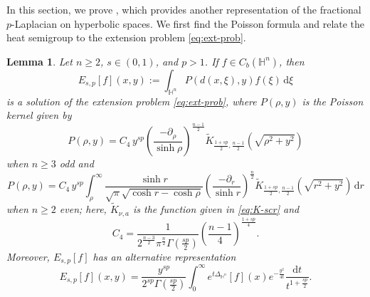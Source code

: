 \documentclass[11pt]{amsart}
\theoremstyle{plain}
\newtheorem{lemma}[theorem]{Lemma}
\theoremstyle{definition}
\numberwithin{equation}{section}
\begin{document}
In this section, we prove , which provides another representation of the fractional $p$-Laplacian on hyperbolic spaces. We first find the Poisson formula and relate the heat semigroup to the extension problem \eqref{eq:ext-prob}.

\begin{lemma} \label{lem:Poisson}
Let $n \geq 2$, $s \in (0,1)$, and $p > 1$. If $f \in C_{b}(\mathbb{H}^{n})$, then
\begin{equation*}
E_{s, p}[f](x, y) := \int_{\mathbb{H}^{n}} P(d(x,\xi), y) f(\xi) \,\mathrm{d}\xi
\end{equation*}
is a solution of the extension problem \eqref{eq:ext-prob}, where $P(\rho, y)$ is the Poisson kernel given by
\begin{equation*}
P(\rho, y) = C_{4} \, y^{sp} \left( \frac{-\partial_\rho}{\sinh \rho} \right)^{\frac{n-1}{2}} \widetilde{K}_{\frac{1+sp}{2},\frac{n-1}{2}} \left( \sqrt{\rho^{2}+y^{2}} \right)
\end{equation*}
when $n \geq 3$ odd and
\begin{equation*}
P(\rho, y) = C_{4} \, y^{sp} \int_{\rho}^{\infty} \frac{\sinh r}{\sqrt{\pi}\sqrt{\cosh r - \cosh \rho}} \left( \frac{-\partial_{r}}{\sinh r} \right)^{\frac{n}{2}} \widetilde{K}_{\frac{1+sp}{2},\frac{n-1}{2}}\left( \sqrt{r^{2}+y^{2}} \right)\, \mathrm{d}r
\end{equation*}
when $n \geq 2$ even; here, $\widetilde{K}_{\nu,a}$ is the function given in \eqref{eq:K-scr} and
\begin{equation*}
C_{4} = \frac{1}{2^{\frac{n-3}{2}}\pi^{\frac{n}{2}} \Gamma(\frac{sp}{2})} \left( \frac{n-1}{4} \right)^{\frac{1+sp}{4}}.
\end{equation*}
Moreover, $E_{s, p}[f]$ has an alternative representation
\begin{equation} \label{eq:U}
E_{s, p}[f](x, y) = \frac{y^{sp}}{2^{sp}\Gamma(\frac{sp}{2})} \int_{0}^{\infty} e^{t\Delta_{\mathbb{H}^{n}}}[f](x) e^{-\frac{y^2}{4t}} \frac{\mathrm{d}t}{t^{1+\frac{sp}{2}}}.
\end{equation}
\end{lemma}
\end{document}
